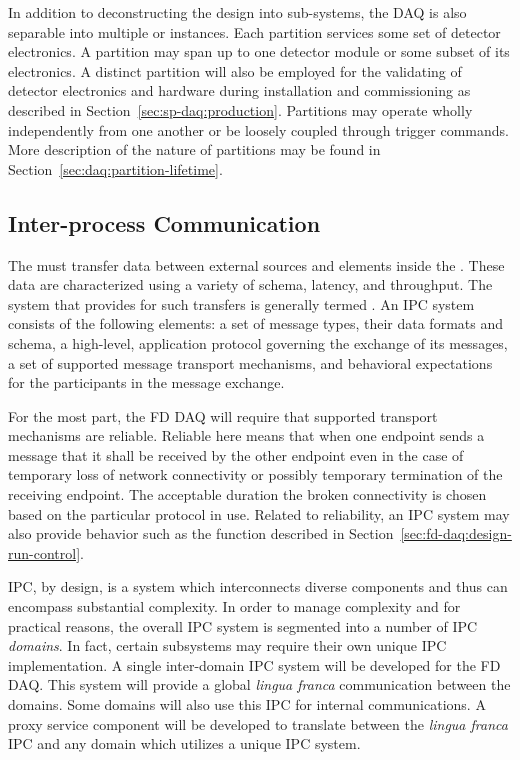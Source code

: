 In addition to deconstructing the design into sub-systems, the DAQ is also separable into multiple  or instances. 
Each partition services some set of detector electronics. 
A partition may span up to one detector module or some subset of its electronics. 
A distinct partition will also be employed for the validating of detector electronics and hardware during installation and commissioning as described in Section~\ref{sec:sp-daq:production}.
Partitions may operate wholly independently from one another or be loosely coupled through trigger commands.  
More description of the nature of partitions may be found in Section~\ref{sec:daq:partition-lifetime}.



  



\subsection{Inter-process Communication}
\label{sec:daq:design-ipc}

The  must transfer data between external sources and elements inside the . 
These data are characterized using a variety of schema, latency, and throughput. 
The system that provides for such transfers is generally termed .
An IPC system consists of the following elements:
a set of message types, their data formats and schema,
a high-level, application protocol governing the exchange of its messages,
a set of supported message transport mechanisms, and
behavioral expectations for the participants in the message exchange. 


For the most part, the FD DAQ will require that supported transport mechanisms are reliable. 
Reliable here means that when one endpoint sends a message that it shall be received by the other endpoint even in the case of temporary loss of network connectivity or possibly temporary termination of the receiving endpoint.
The acceptable duration the broken connectivity is chosen based on the particular protocol in use.
Related to reliability, an IPC system may also provide behavior such as the  function described in Section~\ref{sec:fd-daq:design-run-control}.

IPC, by design, is a system which interconnects diverse components and thus can encompass substantial complexity. 
In order to manage complexity and for practical reasons, the overall IPC system is segmented into a number of IPC \textit{domains}. 
In fact, certain  subsystems may require their own unique IPC implementation.
A single inter-domain IPC system will be developed for the FD DAQ. 
This system will provide a global \textit{lingua franca} communication between the domains. 
Some domains will also use this IPC for internal communications. 
A proxy service component will be developed to translate between the \textit{lingua franca} IPC and any domain which utilizes a unique IPC system.

